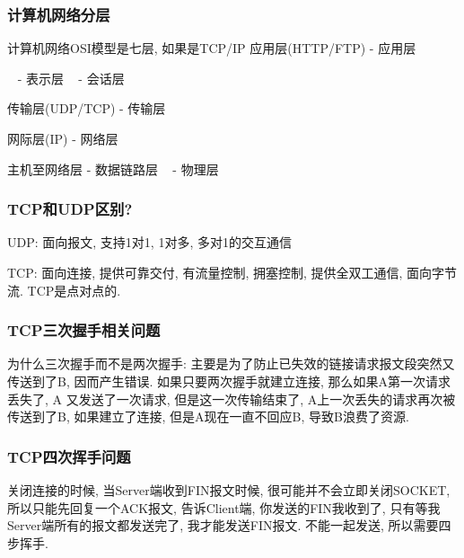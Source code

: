 \documentclass[UTF8]{ctexart}
\begin{document}
\subsubsection{计算机网络分层}
计算机网络OSI模型是七层, 如果是TCP/IP
应用层(HTTP/FTP) - 应用层
\par 
~ - 表示层
~ - 会话层
\par
传输层(UDP/TCP) - 传输层
\par
网际层(IP) - 网络层
\par 
主机至网络层 - 数据链路层
~ - 物理层
\subsubsection{TCP和UDP区别?}
\par
UDP: 面向报文, 支持1对1, 1对多, 多对1的交互通信
\par
TCP: 面向连接, 提供可靠交付, 有流量控制, 拥塞控制, 提供全双工通信, 面向字节流. TCP是点对点的.
\subsubsection{TCP三次握手相关问题}
为什么三次握手而不是两次握手: 主要是为了防止已失效的链接请求报文段突然又传送到了B, 因而产生错误. 如果只要两次握手就建立连接, 那么如果A第一次请求丢失了, A 又发送了一次请求, 但是这一次传输结束了, A上一次丢失的请求再次被传送到了B, 如果建立了连接, 但是A现在一直不回应B, 导致B浪费了资源.
\subsubsection{TCP四次挥手问题}
关闭连接的时候, 当Server端收到FIN报文时候, 很可能并不会立即关闭SOCKET, 所以只能先回复一个ACK报文, 告诉Client端, 你发送的FIN我收到了, 只有等我Server端所有的报文都发送完了, 我才能发送FIN报文. 不能一起发送, 所以需要四步挥手.
\end{document}

